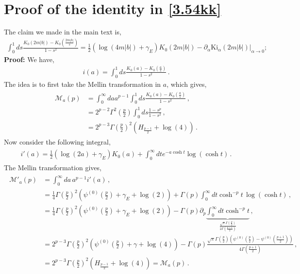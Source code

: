 \section{Proof of the identity in \texorpdfstring{\eqref{3.54kk}}{Eq. 3.54kk}}\label{3.54kkk}
The claim we made in the main text is,
\begin{align}
     \int_0^1 ds\frac{K_0(2m|b|)-K_0\left(\frac{2m|b|}{s}\right)}{1-s^2}  =\frac{1}{2} (\log (4m |b|)+\gamma_{E} ) K_0(2 m|b|)-\partial_\alpha \textrm{Ki}_{\alpha}(2m|b|)|_{\alpha\to0};
\end{align}
\textbf{Proof:} We have,
\begin{align}
    i(a)= \int_0^1 ds\frac{K_0(a)-K_0\left(\frac{a}{s}\right)}{1-s^2}\,.
\end{align}
The idea is to first take the Mellin transformation in $a$, which gives,
\begin{align}
\begin{split}
    \mathcal{M}_{a}(p)&=\int_0^\infty da a^{p-1} \int_0^1 ds\frac{K_0(a)-K_0\left(\frac{a}{s}\right)}{1-s^2}\,,\\ &
    =2^{p-2}\Gamma^2\left(\frac{p}{2}\right)\int_0^1 ds \frac{1-s^p}{1-s^2}\,,\\ &
    =2^{p-3} \Gamma \left(\frac{p}{2}\right)^2 \left(H_{\frac{p-1}{2}}+\log (4)\right)\,.
    \end{split}    
\end{align}
Now consider the following integral,
\begin{align}
    \begin{split}
        i'(a)=\frac{1}{2}(\log(2a)+\gamma_E)K_0(a)+\int_0^\infty dt e^{-a \cosh t}\log(\cosh t)\,.
    \end{split}
\end{align}
The Mellin transformation gives,
\begin{align}
    \begin{split}
        \mathcal{M}'_a(p)&=\int_0^\infty da
        \,a^{p-1} i'(a)\,,\\ &
        =\frac{1}{4} \Gamma \left(\frac{p}{2}\right)^2 \left(\psi ^{(0)}\left(\frac{p}{2}\right)+\gamma_E +\log (2)\right)+\Gamma(p){\int_0^\infty  dt \cosh^{-p}t\, \log(\cosh t)}\,,\\ &
        =\frac{1}{4} \Gamma \left(\frac{p}{2}\right)^2 \left(\psi ^{(0)}\left(\frac{p}{2}\right)+\gamma_E +\log (2)\right)-\Gamma(p)\partial_p\underbrace{\int_0^\infty dt \cosh ^{-p}t}_{\frac{\sqrt{\pi } \Gamma \left(\frac{p}{2}\right)}{2 \Gamma \left(\frac{p+1}{2}\right)}}\,,\\ &
        =2^{p-3} \Gamma \left(\frac{p}{2}\right)^2 \left(\psi ^{(0)}\left(\frac{p}{2}\right)+\gamma +\log (4)\right)-\Gamma(p)\frac{\sqrt{\pi } \Gamma \left(\frac{p}{2}\right) \left(\psi ^{(0)}\left(\frac{p}{2}\right)-\psi ^{(0)}\left(\frac{p+1}{2}\right)\right)}{4 \Gamma \left(\frac{p+1}{2}\right)}\,,\\ &
        =2^{p-3} \Gamma \left(\frac{p}{2}\right)^2 \left(H_{\frac{p-1}{2}}+\log (4)\right)=\mathcal{M}_a(p)\,.
        \end{split}
\end{align}
